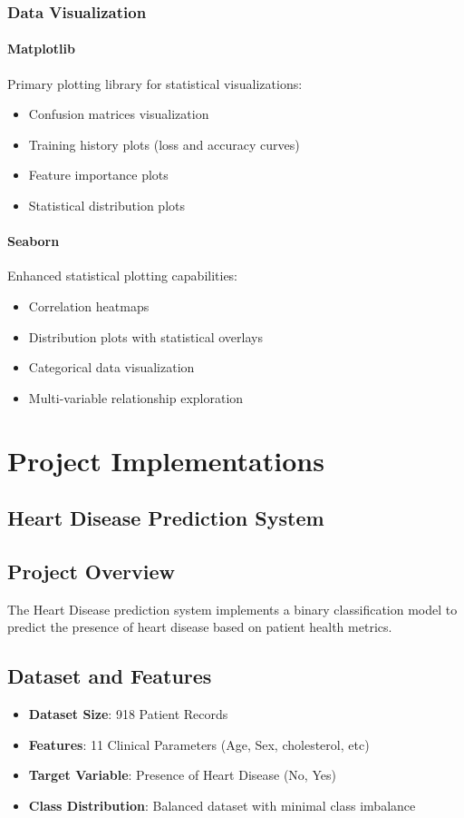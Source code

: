 \documentclass[12pt, a4paper]{article}
\begin{document}
\subsubsection{Data Visualization}

\paragraph{Matplotlib}
Primary plotting library for statistical visualizations:
\begin{itemize}
    \item Confusion matrices visualization
    \item Training history plots (loss and accuracy curves)
    \item Feature importance plots
    \item Statistical distribution plots
\end{itemize}

\paragraph{Seaborn}
Enhanced statistical plotting capabilities:
\begin{itemize}
    \item Correlation heatmaps
    \item Distribution plots with statistical overlays
    \item Categorical data visualization
    \item Multi-variable relationship exploration
\end{itemize}

\section{Project Implementations}

\subsection{Heart Disease Prediction System}

\subsection{Project Overview}
The Heart Disease prediction system implements a binary classification model to predict the presence of heart disease based on patient health metrics.
\subsection{Dataset and Features}
\begin{itemize}
    \item \textbf{Dataset Size}: 918 Patient Records
    \item \textbf{Features}: 11 Clinical Parameters (Age, Sex, cholesterol, etc)
    \item \textbf{Target Variable}: Presence of Heart Disease (No, Yes)
    \item \textbf{Class Distribution}: Balanced dataset with minimal class imbalance
\end{itemize}
\end{document}
